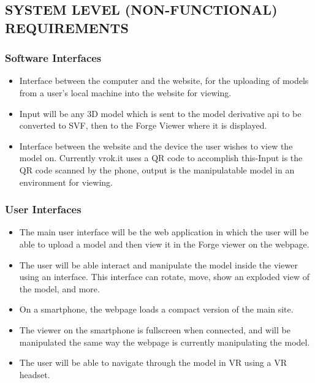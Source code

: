 \documentclass[letterpaper, 10pt, draftclsnofoot, compsoc, onecolumn]{IEEEtran}
\begin{document}
\subsection{SYSTEM LEVEL (NON-FUNCTIONAL) REQUIREMENTS}

\subsubsection{Software Interfaces}
	\begin{itemize}
		\item Interface between the computer and the website, for the uploading of models from a user's local machine into the 
	website for viewing. 
	
		\item Input will be any 3D model which is sent to the model derivative api to be converted to SVF, then to the Forge Viewer where it is displayed.
	
		\item Interface between the website and the device the user wishes to view the model on. Currently vrok.it uses a QR code to accomplish this-Input is the QR code scanned by the phone, output is the manipulatable model in an environment 
	for viewing. 
	\end{itemize}
	

\subsubsection{User Interfaces}

	\begin{itemize}
		\item The main user interface will be the web application in which the user will be able to upload a  model and then view it in the Forge viewer on the  webpage. 
		\item The user will be able interact and manipulate the model inside the viewer using an interface. This interface can rotate, move, show an exploded view of the model, and more.
		\item On a smartphone, the webpage loads a compact version of the main site. 
		\item The viewer on the smartphone is fullscreen when connected, and will be manipulated the same way the webpage is currently manipulating the model.
		\item The user will be able to navigate through the model in VR using a VR headset.
	\end{itemize}
\end{document}
